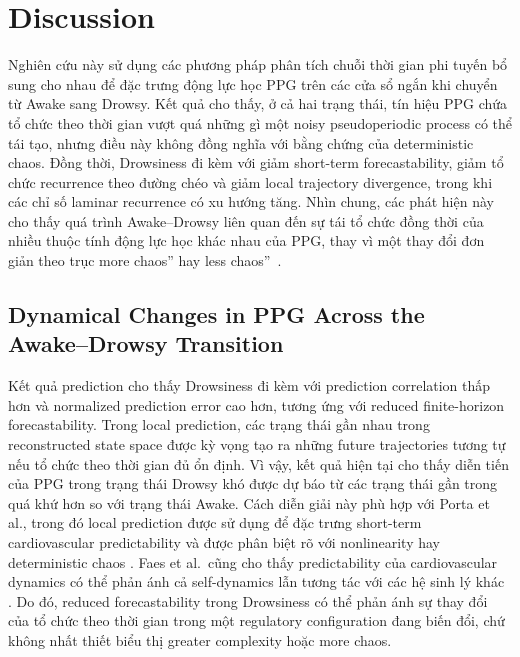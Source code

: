\section{Discussion}

Nghiên cứu này sử dụng các phương pháp phân tích chuỗi thời gian phi tuyến bổ sung cho nhau để đặc trưng động lực học PPG trên các cửa sổ ngắn khi chuyển từ Awake sang Drowsy. Kết quả cho thấy, ở cả hai trạng thái, tín hiệu PPG chứa tổ chức theo thời gian vượt quá những gì một noisy pseudoperiodic process có thể tái tạo, nhưng điều này không đồng nghĩa với bằng chứng của deterministic chaos. Đồng thời, Drowsiness đi kèm với giảm short-term forecastability, giảm tổ chức recurrence theo đường chéo và giảm local trajectory divergence, trong khi các chỉ số laminar recurrence có xu hướng tăng. Nhìn chung, các phát hiện này cho thấy quá trình Awake--Drowsy liên quan đến sự tái tổ chức đồng thời của nhiều thuộc tính động lực học khác nhau của PPG, thay vì một thay đổi đơn giản theo trục more chaos'' hay less chaos''~\cite{porta2007_prediction,porta2015,calderonjuarez2023,hu2009}.

\subsection{Dynamical Changes in PPG Across the Awake--Drowsy Transition}

Kết quả prediction cho thấy Drowsiness đi kèm với prediction correlation thấp hơn và normalized prediction error cao hơn, tương ứng với reduced finite-horizon forecastability. Trong local prediction, các trạng thái gần nhau trong reconstructed state space được kỳ vọng tạo ra những future trajectories tương tự nếu tổ chức theo thời gian đủ ổn định. Vì vậy, kết quả hiện tại cho thấy diễn tiến của PPG trong trạng thái Drowsy khó được dự báo từ các trạng thái gần trong quá khứ hơn so với trạng thái Awake. Cách diễn giải này phù hợp với Porta et al., trong đó local prediction được sử dụng để đặc trưng short-term cardiovascular predictability và được phân biệt rõ với nonlinearity hay deterministic chaos \cite{porta2007_prediction}. Faes et al.\ cũng cho thấy predictability của cardiovascular dynamics có thể phản ánh cả self-dynamics lẫn tương tác với các hệ sinh lý khác \cite{faes2016}. Do đó, reduced forecastability trong Drowsiness có thể phản ánh sự thay đổi của tổ chức theo thời gian trong một regulatory configuration đang biến đổi, chứ không nhất thiết biểu thị greater complexity hoặc more chaos.

